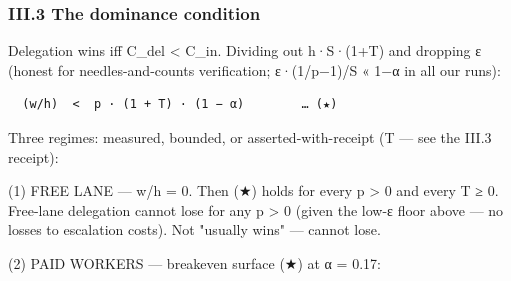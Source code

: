 \documentclass[
]{article}
\begin{document}
\subsubsection{III.3 The dominance
condition}\label{iii3-the-dominance-condition}

Delegation wins iff C\_del \textless{} C\_in. Dividing out h·S·(1+T) and
dropping ε (honest for needles-and-counts verification; ε·(1/p−1)/S «
1−α in all our runs):

\begin{verbatim}
  (w/h)  <  p · (1 + T) · (1 − α)        … (★)
\end{verbatim}

Three regimes: measured, bounded, or asserted-with-receipt (T --- see
the III.3 receipt):

(1) FREE LANE --- w/h = 0. Then (★) holds for every p \textgreater{} 0
and every T ≥ 0. Free-lane delegation cannot lose for any p
\textgreater{} 0 (given the low-ε floor above --- no losses to
escalation costs). Not "usually wins" --- cannot lose.

(2) PAID WORKERS --- breakeven surface (★) at α = 0.17:
\end{document}
